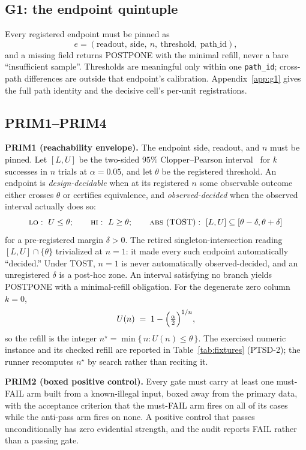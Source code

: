 \documentclass{article}
\begin{document}
\subsection{G1: the endpoint quintuple}
\label{sec:g1}

Every registered endpoint must be pinned as
\[
e = (\text{readout},\ \text{side},\ n,\ \text{threshold},\ \text{path\_id}),
\]
and a missing field returns POSTPONE with the minimal refill, never a bare ``insufficient
sample''. Thresholds are meaningful only within one \texttt{path\_id}; cross-path
differences are outside that endpoint's calibration. Appendix~\ref{app:g1} gives the full
path identity and the decisive cell's per-unit registrations.

\subsection{PRIM1--PRIM4}
\label{sec:prims}

\textbf{PRIM1 (reachability envelope).} The endpoint side, readout, and $n$ must be pinned.
Let $[L,U]$ be the two-sided $95\%$ Clopper--Pearson interval~\citep{clopper1934use} for
$k$ successes in $n$ trials at $\alpha=0.05$, and let $\theta$ be the registered threshold.
An endpoint is \emph{design-decidable} when at its registered $n$ some observable outcome
either crosses $\theta$ or certifies equivalence, and \emph{observed-decided} when the
observed interval actually does so:
\[
\textsc{lo}:\ U \le \theta;
\qquad
\textsc{hi}:\ L \ge \theta;
\qquad
\textsc{abs}\ (\text{TOST}):\ [L,U]\subseteq[\theta-\delta,\theta+\delta]
\]
for a pre-registered margin $\delta>0$. The retired singleton-intersection reading
$[L,U]\cap\{\theta\}$ trivialized at $n=1$: it made every such endpoint automatically
``decided.'' Under TOST, $n=1$ is never automatically observed-decided, and an unregistered
$\delta$ is a post-hoc zone. An interval satisfying no branch yields POSTPONE with a
minimal-refill obligation. For the degenerate zero column $k=0$,
\[
U(n) \;=\; 1-\Bigl(\tfrac{\alpha}{2}\Bigr)^{1/n},
\]
so the refill is the integer
$n^{\star} = \min\{\, n : U(n) \le \theta \,\}$. The exercised numeric instance and its
checked refill are reported in Table~\ref{tab:fixtures} (PTSD-2); the runner recomputes
$n^{\star}$ by search rather than reciting it.

\textbf{PRIM2 (boxed positive control).} Every gate must carry at least one must-FAIL arm
built from a known-illegal input, boxed away from the primary data, with the acceptance
criterion that the must-FAIL arm fires on all of its cases while the anti-pass arm fires
on none. A positive control that passes unconditionally has zero evidential strength, and
the audit reports FAIL rather than a passing gate.
\end{document}

